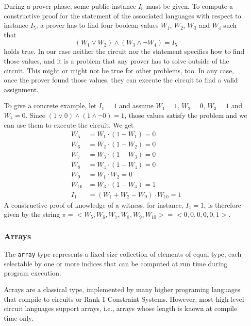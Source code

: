 \begin{example}
During a prover-phase, some public instance $I_5$ must be given. To compute a constructive proof for the statement of the associated languages with respect to instance $I_5$, a prover has to find four boolean values $W_1$, $W_2$, $W_3$ and $W_4$ such that 
$$
\left( W_1 \vee W_2 \right) \wedge (W_3 \wedge \lnot W_4) = I_5
$$ 
holds true. In our case neither the circuit nor the  statement specifies how to find those values, and it is a problem that any prover has to solve outside of the circuit. This might or might not be true for other problems, too. In any case, once the prover found those values, they can execute the circuit to find a valid assignment. 

To give a concrete example, let $I_1=1$ and assume $W_1=1$, $W_2=0$, $W_3=1$ and $W_4=0$. Since 
$\left( 1 \vee 0 \right) \wedge (1 \wedge \lnot 0) = 1$, those values satisfy the problem and we can use them to execute the circuit. We get 
\begin{align*}
W_5 & = W_1 \cdot (1- W_1) = 0\\
W_6 & = W_2 \cdot (1- W_2) = 0 \\
W_7 & = W_3 \cdot (1- W_3) = 0 \\
W_8 & = W_4 \cdot (1- W_4) = 0 \\
W_9 & = W_1\cdot W_2 = 0\\
W_{10} & = W_3 \cdot (1-W_4) = 1\\
I_1 & = (W_1 + W_2 - W_9) \cdot W_{10} = 1
\end{align*}
A constructive proof of knowledge of a witness, for instance, $I_1=1$, is therefore given by the string $\pi=<W_5,W_6,W_7,W_8,W_9,W_{10}>=<0,0,0,0,0,1>$. 
\end{example}
\subsubsection{Arrays} The \texttt{array} type represents a fixed-size collection of elements of equal type, each selectable by one or more indices that can be computed at run time during program execution. 

Arrays are a classical type, implemented by many higher programing languages that compile to circuits or Rank-1 Constraint Systems. However, most high-level circuit languages support  arrays, i.e., arrays whose length is known at compile time only. 

